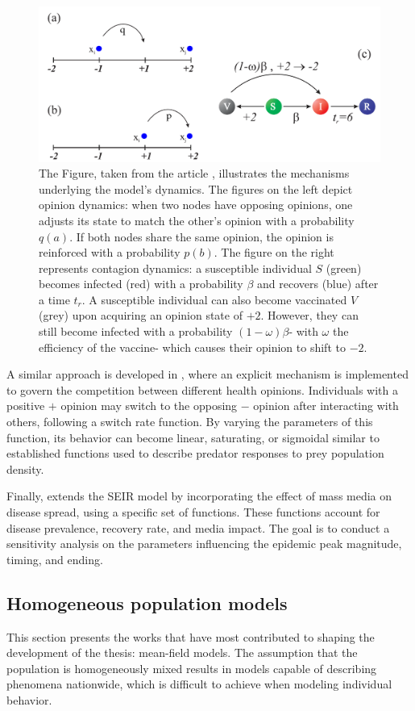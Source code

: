 \begin{figure}[ht]
	\centering
	\includegraphics[width=0.8\linewidth]{0_introduction/images_review/alvarez_opi_vac}
	\caption[Rules in opinion disease model]{The Figure, taken from the article \cite{Alvarez_Zuzek_2017}, illustrates the mechanisms underlying the model's dynamics. The figures on the left depict opinion dynamics: when two nodes have opposing opinions, one adjusts its state to match the other's opinion with a probability $q(a)$. If both nodes share the same opinion, the opinion is reinforced with a probability $p(b)$. The figure on the right represents contagion dynamics: a susceptible individual $S$ (green) becomes infected (red) with a probability $\beta$ and recovers (blue) after a time $t_r$. A susceptible individual can also become vaccinated $V$ (grey) upon acquiring an opinion state of $+2$. However, they can still become infected with a probability $(1-\omega) \beta$- with $\omega$ the efficiency of the vaccine- which causes their opinion to shift to $-2$. }
	\label{fig:alvarez_opi_vac}
\end{figure}

A similar approach is developed in \cite{teslya2022}, where an explicit mechanism is implemented to govern the competition between different health opinions. Individuals with a positive $+$ opinion may switch to the opposing $-$ opinion after interacting with others, following a switch rate function. By varying the parameters of this function, its behavior can become linear, saturating, or sigmoidal similar to established functions used to describe predator responses to prey population density.

Finally, \cite{Collinson2014} extends the SEIR model by incorporating the effect of mass media on disease spread, using a specific set of functions. These functions account for disease prevalence, recovery rate, and media impact. The goal is to conduct a sensitivity analysis on the parameters influencing the epidemic peak magnitude, timing, and ending. 

\subsection{Homogeneous population models}
\label{subsec:homogeneous}
This section presents the works that have most contributed to shaping the development of the thesis: mean-field models. The assumption that the population is homogeneously mixed results in models capable of describing phenomena nationwide, which is difficult to achieve when modeling individual behavior.

